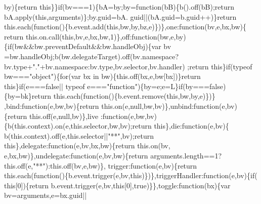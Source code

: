\begin{DoxyCode}
      by)\{\textcolor{keywordflow}{return} \textcolor{keyword}{this}\}\}\textcolor{keywordflow}{if}(bv===1)\{bA=by;by=\textcolor{keyword}{function}(bB)\{b().off(bB);\textcolor{keywordflow}{return} bA.apply(\textcolor{keyword}{this},arguments)\};by.guid=bA.
      guid||(bA.guid=b.guid++)\}\textcolor{keywordflow}{return} this.each(\textcolor{keyword}{function}()\{b.event.add(\textcolor{keyword}{this},bw,by,bz,e)\})\},one:\textcolor{keyword}{function}(bv,e,bx,bw)\{\textcolor{keywordflow}{
      return} this.on.call(\textcolor{keyword}{this},bv,e,bx,bw,1)\},off:\textcolor{keyword}{function}(bw,e,by)\{\textcolor{keywordflow}{if}(bw&&bw.preventDefault&&bw.handleObj)\{var bv
      =bw.handleObj;b(bw.delegateTarget).off(bv.namespace?bv.type+\textcolor{stringliteral}{"."}+bv.namespace:bv.type,bv.selector,bv.handler)
      ;\textcolor{keywordflow}{return} \textcolor{keyword}{this}\}\textcolor{keywordflow}{if}(typeof bw===\textcolor{stringliteral}{"object"})\{\textcolor{keywordflow}{for}(var bx in bw)\{this.off(bx,e,bw[bx])\}\textcolor{keywordflow}{return} \textcolor{keyword}{this}\}\textcolor{keywordflow}{if}(e===\textcolor{keyword}{false}||
      typeof e===\textcolor{stringliteral}{"function"})\{by=e;e=L\}\textcolor{keywordflow}{if}(by===\textcolor{keyword}{false})\{by=bk\}\textcolor{keywordflow}{return} this.each(\textcolor{keyword}{function}()\{b.event.remove(\textcolor{keyword}{this},bw,by,e)\})\}
      ,bind:\textcolor{keyword}{function}(e,bw,bv)\{\textcolor{keywordflow}{return} this.on(e,null,bw,bv)\},unbind:\textcolor{keyword}{function}(e,bv)\{\textcolor{keywordflow}{return} this.off(e,null,bv)\},live
      :\textcolor{keyword}{function}(e,bw,bv)\{b(this.context).on(e,this.selector,bw,bv);\textcolor{keywordflow}{return} \textcolor{keyword}{this}\},die:\textcolor{keyword}{function}(e,bv)\{
      b(this.context).off(e,this.selector||\textcolor{stringliteral}{"**"},bv);\textcolor{keywordflow}{return} \textcolor{keyword}{this}\},delegate:\textcolor{keyword}{function}(e,bv,bx,bw)\{\textcolor{keywordflow}{return} this.on(bv,
      e,bx,bw)\},undelegate:\textcolor{keyword}{function}(e,bv,bw)\{\textcolor{keywordflow}{return} arguments.length==1?this.off(e,\textcolor{stringliteral}{"**"}):this.off(bv,e,bw)\},
      trigger:function(e,bv)\{\textcolor{keywordflow}{return} this.each(\textcolor{keyword}{function}()\{b.event.trigger(e,bv,\textcolor{keyword}{this})\})\},triggerHandler:\textcolor{keyword}{function}(e,bv)\{\textcolor{keywordflow}{if}(\textcolor{keyword}{
      this}[0])\{\textcolor{keywordflow}{return} b.event.trigger(e,bv,\textcolor{keyword}{this}[0],\textcolor{keyword}{true})\}\},toggle:\textcolor{keyword}{function}(bx)\{var bv=arguments,e=bx.guid||

\end{DoxyCode}

